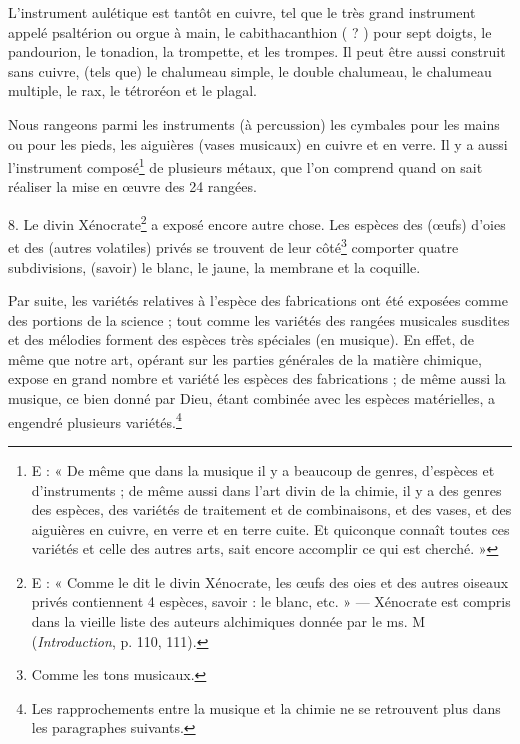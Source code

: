 \documentclass[a4paper, 11pt, oneside, polutonikogreek, french]{article}
\begin{document}
L'instrument aulétique est tantôt en cuivre, tel que le très grand instrument appelé psaltérion ou orgue à main, le cabithacanthion ( ? ) pour sept doigts, le pandourion, le tonadion, la trompette, et les trompes. Il peut être aussi construit sans cuivre, (tels que) le chalumeau simple, le double chalumeau, le chalumeau multiple, le rax, le tétroréon et le plagal.

Nous rangeons parmi les instruments (à percussion) les cymbales pour les mains ou pour les pieds, les aiguières (vases musicaux) en cuivre et en verre. Il y a aussi l'instrument composé\footnote{E : « De même que dans la musique il y a beaucoup de genres, d'espèces et d'instruments ; de même aussi dans l'art divin de la chimie, il y a des genres des espèces, des variétés de traitement et de combinaisons, et des vases, et des aiguières en cuivre, en verre et en terre cuite. Et quiconque connaît toutes ces variétés et celle des autres arts, sait encore accomplir ce qui est cherché. »} de plusieurs métaux, que l'on comprend quand on sait réaliser la mise en œuvre des 24 rangées.

8. Le divin Xénocrate\footnote{E : « Comme le dit le divin Xénocrate, les œufs des oies et des autres oiseaux privés contiennent 4 espèces, savoir : le blanc, etc. » --- Xénocrate est compris dans la vieille liste des auteurs alchimiques donnée par le ms. M (\emph{Introduction}, p. 110, 111).} a exposé encore autre chose. Les espèces des (œufs) d'oies et des (autres volatiles) privés se trouvent de leur côté\footnote{Comme les tons musicaux.} comporter quatre subdivisions, (savoir) le blanc, le jaune, la membrane et la coquille.

Par suite, les variétés relatives à l'espèce des fabrications ont été exposées comme des portions de la science ; tout comme les variétés des rangées musicales susdites et des mélodies forment des espèces très spéciales (en musique). En effet, de même que notre art, opérant sur les parties générales de la matière chimique, expose en grand nombre et variété les espèces des fabrications ; de même aussi la musique, ce bien donné par Dieu, étant combinée avec les espèces matérielles, a engendré plusieurs variétés.\footnote{Les rapprochements entre la musique et la chimie ne se retrouvent plus dans les paragraphes suivants.}
\end{document}
